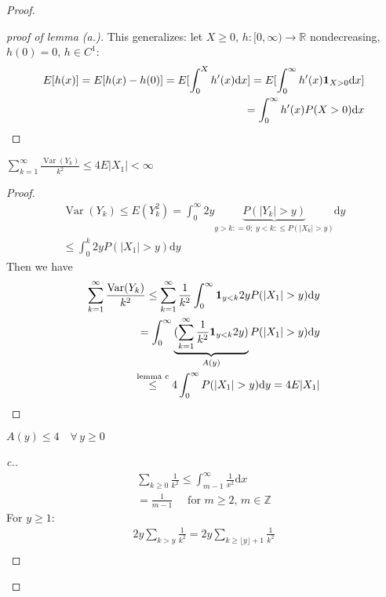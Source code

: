 \documentclass[11pt]{article}
\begin{document}
\begin{proof}
\begin{proof}[proof of lemma (a.)]
        This generalizes: let $X \ge 0,\, h:[0,\infty) \to \mathbb{R}$ nondecreasing, $h(0) = 0,\, 
        h \in C^{1}$:
        \begin{align}
            E[h(x)] = E[h(x) - h(0)] = E[\int_{0}^{X}h'(x)  \mathrm{d}x] = 
            E[\int_{0}^{\infty}h'(x)\bm{1}_{X > 0}  \mathrm{d}x] \\
            = \int_{0}^{\infty}h'(x)P(X > 0)  \mathrm{d}x
        \end{align}
    \end{proof}
    \begin{lemma}[b.]
        $\sum_{k=1}^{\infty} \frac{\operatorname{Var}(Y_k)}{k^{2}} \le 4E|X_1| < \infty$
    \end{lemma}
    \begin{proof}
        \begin{align}
            \operatorname{Var}(Y_k) \le E(Y_k^{2}) = \int_{0}^{\infty}2y \underbrace{P(|Y_k| > y)}_{
                y>k: = 0; \; y < k: \le P(|X_k| > y)
            }  \mathrm{d}y \\
            \le \int_{0}^{k}2y P(|X_1| > y)  \mathrm{d}y 
        \end{align}
        Then we have
        \begin{align}
            \sum_{k=1}^{\infty}\frac{\operatorname{Var}(Y_k)}{k^{2}} \le \sum_{k=1}^{\infty}
            \frac{1}{k^{2}}\int_{0}^{\infty}\1_{y<k}2yP(|X_1| > y)  \mathrm{d}y \\
            = \int_{0}^{\infty}
            \underbrace{(\sum_{k=1}^{\infty}\frac{1}{k^{2}}\1_{y<k}2y)}_{A(y)}
            P(|X_1|>y)  \mathrm{d}y \\
            \overset{\text{lemma c}}{\le} 4\int_{0}^{\infty}P(|X_1| > y)  \mathrm{d}y = 4E|X_1|
        \end{align}
    \end{proof}
    \begin{lemma}[c.]
        $A(y) \le 4 \quad \forall \,y\ge 0$
    \end{lemma}
    \begin{proof}[c.]
        \begin{align}
            \sum_{k \ge 0}\frac{1}{k^{2}} \le \int_{m-1}^{\infty}\frac{1}{x^{2}}  \mathrm{d}x\\
            = \frac{1}{m-1} \quad \text{ for }m \ge 2\text{, }m \in \mathbb{Z}
        \end{align}
        For $y \ge 1:$
        \begin{align}
            2y \sum_{k > y}\frac{1}{k^{2}} = 2y \sum_{k\ge \lfloor y \rfloor + 1}\frac{1}{k^{2}}\\

\end{align}
\end{proof}
\end{proof}
\end{document}
